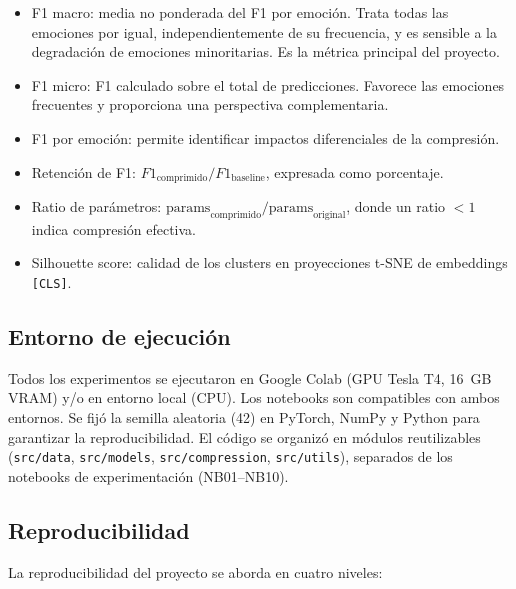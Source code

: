 \begin{itemize}[nosep]
    \item F1 macro: media no ponderada del F1 por emoción. Trata todas las
    emociones por igual, independientemente de su frecuencia, y es sensible a la
    degradación de emociones minoritarias. Es la métrica principal del proyecto.
    \item F1 micro: F1 calculado sobre el total de predicciones. Favorece
    las emociones frecuentes y proporciona una perspectiva complementaria.
    \item F1 por emoción: permite identificar impactos diferenciales de la
    compresión.
    \item Retención de F1: $F1_{\text{comprimido}} / F1_{\text{baseline}}$,
    expresada como porcentaje.
    \item Ratio de parámetros: $\text{params}_{\text{comprimido}} /
    \text{params}_{\text{original}}$, donde un ratio $< 1$ indica compresión
    efectiva.
    \item Silhouette score: calidad de los clusters en proyecciones t-SNE
    de embeddings \texttt{[CLS]}.
\end{itemize}

\subsection{Entorno de ejecución}
\label{sec:met-entorno}

Todos los experimentos se ejecutaron en Google Colab (GPU Tesla T4, 16~GB VRAM) y/o
en entorno local (CPU). Los notebooks son compatibles con ambos entornos. Se fijó la
semilla aleatoria (42) en PyTorch, NumPy y Python para garantizar la reproducibilidad.
El código se organizó en módulos reutilizables (\texttt{src/data},
\texttt{src/models}, \texttt{src/compression}, \texttt{src/utils}), separados de los
notebooks de experimentación (NB01--NB10).

\subsection{Reproducibilidad}
\label{sec:met-reproducibilidad}

La reproducibilidad del proyecto se aborda en cuatro niveles:

